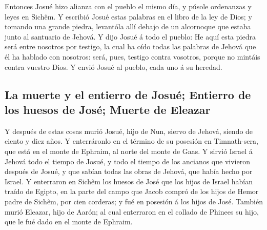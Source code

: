  Entonces Josué hizo alianza con el pueblo el mismo día, y
púsole ordenanzas y leyes en Sichêm.  Y escribió Josué
estas palabras en el libro de la ley de Dios; y tomando una grande
piedra, levantóla allí debajo de un alcornoque que estaba junto al
santuario de Jehová.  Y dijo Josué á todo el pueblo: He
aquí esta piedra será entre nosotros por testigo, la cual ha oído todas
las palabras de Jehová que él ha hablado con nosotros: será, pues,
testigo contra vosotros, porque no mintáis contra vuestro Dios.
 Y envió Josué al pueblo, cada uno á su heredad.

\hypertarget{la-muerte-y-el-entierro-de-josuuxe9-entierro-de-los-huesos-de-josuxe9-muerte-de-eleazar}{%
\subsection{La muerte y el entierro de Josué; Entierro de los huesos de
José; Muerte de
Eleazar}\label{la-muerte-y-el-entierro-de-josuuxe9-entierro-de-los-huesos-de-josuxe9-muerte-de-eleazar}}

 Y después de estas cosas murió Josué, hijo de Nun, siervo
de Jehová, siendo de ciento y diez años.  Y enterráronlo en
el término de su posesión en Timnath-sera, que está en el monte de
Ephraim, al norte del monte de Gaas.  Y sirvió Israel á
Jehová todo el tiempo de Josué, y todo el tiempo de los ancianos que
vivieron después de Josué, y que sabían todas las obras de Jehová, que
había hecho por Israel.  Y enterraron en Sichêm los huesos
de José que los hijos de Israel habían traído de Egipto, en la parte del
campo que Jacob compró de los hijos de Hemor padre de Sichêm, por cien
corderas; y fué en posesión á los hijos de José.  También
murió Eleazar, hijo de Aarón; al cual enterraron en el collado de
Phinees su hijo, que le fué dado en el monte de Ephraim.
